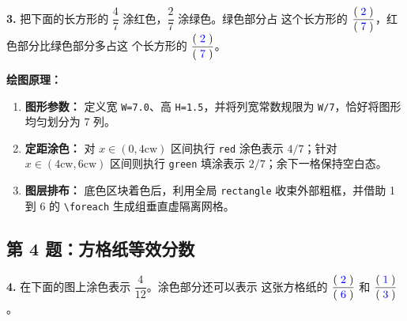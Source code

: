 \textbf{3.} 把下面的长方形的 $\dfrac{4}{7}$ 涂红色，$\dfrac{2}{7}$ 涂绿色。绿色部分占
这个长方形的 $\dfrac{(\;\textcolor{blue}{2}\;)}{(\;\textcolor{blue}{7}\;)}$，红色部分比绿色部分多占这
个长方形的 $\dfrac{(\;\textcolor{blue}{2}\;)}{(\;\textcolor{blue}{7}\;)}$。

\vspace{0.5cm}
\begin{center}
\end{center}

\vspace{0.5cm}
\textbf{绘图原理：}
\begin{enumerate}
    \item \textbf{图形参数：} 定义宽 \texttt{W=7.0}、高 \texttt{H=1.5}，并将列宽常数规限为 \texttt{W/7}，恰好将图形均匀划分为 7 列。
    \item \textbf{定距涂色：} 对 $x \in (0, 4\text{cw})$ 区间执行 \texttt{red} 涂色表示 $4/7$；针对 $x \in (4\text{cw}, 6\text{cw})$ 区间则执行 \texttt{green} 填涂表示 $2/7$；余下一格保持空白态。
    \item \textbf{图层排布：} 底色区块着色后，利用全局 \texttt{rectangle} 收束外部粗框，并借助 1 到 6 的 \texttt{\textbackslash foreach} 生成组垂直虚隔离网格。
\end{enumerate}

\vspace{1.5cm}

\newpage

\subsection{第 4 题：方格纸等效分数}

\textbf{4.} 在下面的图上涂色表示 $\dfrac{4}{12}$。涂色部分还可以表示
这张方格纸的 $\dfrac{(\;\textcolor{blue}{2}\;)}{(\;\textcolor{blue}{6}\;)}$ 和 $\dfrac{(\;\textcolor{blue}{1}\;)}{(\;\textcolor{blue}{3}\;)}$。

